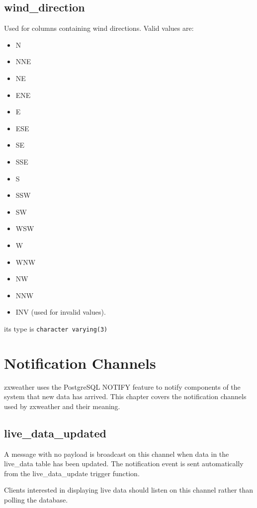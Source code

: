 \documentclass[a4paper,10pt]{book}
\newcommand{\partnumber}{\ifthenelse{\isundefined{\projectnum}}{}{\projectnum-\docnum	\ifthenelse{\equal{\docrev}{001}}{}{.\docrev}}}
\begin{document}
\section{wind\_direction}
\label{wind_direction}

Used for columns containing wind directions. Valid values are:
\begin{itemize}
\item N
\item NNE
\item NE
\item ENE
\item E
\item ESE
\item SE
\item SSE
\item S
\item SSW
\item SW
\item WSW
\item W
\item WNW
\item NW
\item NNW
\item INV (used for invalid values).
\end{itemize}

its type is \verb|character varying(3)|


\chapter{Notification Channels}
\label{cha_notify}

zxweather uses the PostgreSQL NOTIFY feature to notify components of the system that new data has arrived. This chapter covers the notification channels used by zxweather and their meaning.

\section{live\_data\_updated}
A message with no payload is broadcast on this channel when data in the live\_data table has been updated. The notification event is sent automatically from the live\_data\_update trigger function.

Clients interested in displaying live data should listen on this channel rather than polling the database.



\newpage
\thispagestyle{empty}
\begin{flushright}
\null
\vfill
\tt \partnumber
\end{flushright}
\end{document}
